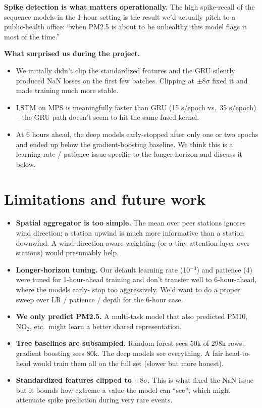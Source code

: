 \documentclass{article}
\begin{document}
\textbf{Spike detection is what matters operationally.} The high
spike-recall of the sequence models in the 1-hour setting is the
result we'd actually pitch to a public-health office: ``when PM2.5 is
about to be unhealthy, this model flags it most of the time.''

\textbf{What surprised us during the project.}
\begin{itemize}[leftmargin=*, itemsep=2pt]
  \item We initially didn't clip the standardized features and the GRU
    silently produced NaN losses on the first few batches. Clipping at
    $\pm 8\sigma$ fixed it and made training much more stable.
  \item LSTM on MPS is meaningfully faster than GRU (15 s/epoch vs.\
    35 s/epoch) -- the GRU path doesn't seem to hit the same fused
    kernel.
  \item At 6 hours ahead, the deep models early-stopped after only one
    or two epochs and ended up below the gradient-boosting baseline.
    We think this is a learning-rate / patience issue specific to the
    longer horizon and discuss it below.
\end{itemize}

\section{Limitations and future work}
\label{sec:limits}

\begin{itemize}[leftmargin=*, itemsep=2pt]
  \item \textbf{Spatial aggregator is too simple.} The mean over peer
    stations ignores wind direction; a station upwind is much more
    informative than a station downwind. A wind-direction-aware
    weighting (or a tiny attention layer over stations) would
    presumably help.
  \item \textbf{Longer-horizon tuning.} Our default learning rate
    (10$^{-3}$) and patience (4) were tuned for 1-hour-ahead training
    and don't transfer well to 6-hour-ahead, where the models early-
    stop too aggressively. We'd want to do a proper sweep over LR /
    patience / depth for the 6-hour case.
  \item \textbf{We only predict PM2.5.} A multi-task model that also
    predicted PM10, NO$_2$, etc.\ might learn a better shared
    representation.
  \item \textbf{Tree baselines are subsampled.} Random forest sees 50k
    of 298k rows; gradient boosting sees 80k. The deep models see
    everything. A fair head-to-head would train them all on the full
    set (slower but more honest).
  \item \textbf{Standardized features clipped to $\pm 8\sigma$.} This
    is what fixed the NaN issue but it bounds how extreme a value the
    model can ``see'', which might attenuate spike prediction during
    very rare events.
\end{itemize}
\end{document}

